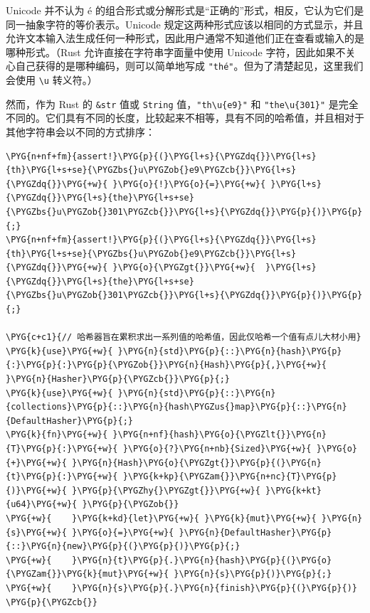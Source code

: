 Unicode 并不认为 é 的组合形式或分解形式是“正确的”形式，相反，它认为它们是同一抽象字符的等价表示。Unicode 规定这两种形式应该以相同的方式显示，并且允许文本输入法生成任何一种形式，因此用户通常不知道他们正在查看或输入的是哪种形式。（Rust 允许直接在字符串字面量中使用 Unicode 字符，因此如果不关心自己获得的是哪种编码，则可以简单地写成 \texttt{"thé"}。但为了清楚起见，这里我们会使用 \texttt{\textbackslash{}u} 转义符。）

然而，作为 Rust 的 \texttt{\&str} 值或 \texttt{String} 值，\texttt{"th\textbackslash{}u\{e9\}"} 和 \texttt{"the\textbackslash{}u\{301\}"} 是完全不同的。它们具有不同的长度，比较起来不相等，具有不同的哈希值，并且相对于其他字符串会以不同的方式排序：

\begin{Verbatim}[commandchars=\\\{\},breaklines=true,breakanywhere=true,fontsize=\codefont,xleftmargin=17bp]
\PYG{n+nf+fm}{assert!}\PYG{p}{(}\PYG{l+s}{\PYGZdq{}}\PYG{l+s}{th}\PYG{l+s+se}{\PYGZbs{}u\PYGZob{}e9\PYGZcb{}}\PYG{l+s}{\PYGZdq{}}\PYG{+w}{ }\PYG{o}{!}\PYG{o}{=}\PYG{+w}{ }\PYG{l+s}{\PYGZdq{}}\PYG{l+s}{the}\PYG{l+s+se}{\PYGZbs{}u\PYGZob{}301\PYGZcb{}}\PYG{l+s}{\PYGZdq{}}\PYG{p}{)}\PYG{p}{;}
\PYG{n+nf+fm}{assert!}\PYG{p}{(}\PYG{l+s}{\PYGZdq{}}\PYG{l+s}{th}\PYG{l+s+se}{\PYGZbs{}u\PYGZob{}e9\PYGZcb{}}\PYG{l+s}{\PYGZdq{}}\PYG{+w}{ }\PYG{o}{\PYGZgt{}}\PYG{+w}{  }\PYG{l+s}{\PYGZdq{}}\PYG{l+s}{the}\PYG{l+s+se}{\PYGZbs{}u\PYGZob{}301\PYGZcb{}}\PYG{l+s}{\PYGZdq{}}\PYG{p}{)}\PYG{p}{;}

\PYG{c+c1}{// 哈希器旨在累积求出一系列值的哈希值，因此仅哈希一个值有点儿大材小用}
\PYG{k}{use}\PYG{+w}{ }\PYG{n}{std}\PYG{p}{::}\PYG{n}{hash}\PYG{p}{:}\PYG{p}{:}\PYG{p}{\PYGZob{}}\PYG{n}{Hash}\PYG{p}{,}\PYG{+w}{ }\PYG{n}{Hasher}\PYG{p}{\PYGZcb{}}\PYG{p}{;}
\PYG{k}{use}\PYG{+w}{ }\PYG{n}{std}\PYG{p}{::}\PYG{n}{collections}\PYG{p}{::}\PYG{n}{hash\PYGZus{}map}\PYG{p}{::}\PYG{n}{DefaultHasher}\PYG{p}{;}
\PYG{k}{fn}\PYG{+w}{ }\PYG{n+nf}{hash}\PYG{o}{\PYGZlt{}}\PYG{n}{T}\PYG{p}{:}\PYG{+w}{ }\PYG{o}{?}\PYG{n+nb}{Sized}\PYG{+w}{ }\PYG{o}{+}\PYG{+w}{ }\PYG{n}{Hash}\PYG{o}{\PYGZgt{}}\PYG{p}{(}\PYG{n}{t}\PYG{p}{:}\PYG{+w}{ }\PYG{k+kp}{\PYGZam{}}\PYG{n+nc}{T}\PYG{p}{)}\PYG{+w}{ }\PYG{p}{\PYGZhy{}\PYGZgt{}}\PYG{+w}{ }\PYG{k+kt}{u64}\PYG{+w}{ }\PYG{p}{\PYGZob{}}
\PYG{+w}{    }\PYG{k+kd}{let}\PYG{+w}{ }\PYG{k}{mut}\PYG{+w}{ }\PYG{n}{s}\PYG{+w}{ }\PYG{o}{=}\PYG{+w}{ }\PYG{n}{DefaultHasher}\PYG{p}{::}\PYG{n}{new}\PYG{p}{(}\PYG{p}{)}\PYG{p}{;}
\PYG{+w}{    }\PYG{n}{t}\PYG{p}{.}\PYG{n}{hash}\PYG{p}{(}\PYG{o}{\PYGZam{}}\PYG{k}{mut}\PYG{+w}{ }\PYG{n}{s}\PYG{p}{)}\PYG{p}{;}
\PYG{+w}{    }\PYG{n}{s}\PYG{p}{.}\PYG{n}{finish}\PYG{p}{(}\PYG{p}{)}
\PYG{p}{\PYGZcb{}}


\end{Verbatim}
